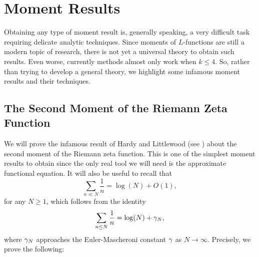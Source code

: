 \chapter{Moment Results}
  Obtaining any type of moment result is, generally speaking, a very difficult task requiring delicate analytic techniques. Since moments of $L$-functions are still a modern topic of research, there is not yet a universal theory to obtain such results. Even worse, currently methods almost only work when $k \le 4$. So, rather than trying to develop a general theory, we highlight some infamous moment results and their techniques.
  \section{The Second Moment of the Riemann Zeta Function}
    We will prove the infamous result of Hardy and Littlewood (see \cite{hardy1916contributions}) about the second moment of the Riemann zeta function. This is one of the simplest moment results to obtain since the only real tool we will need is the approximate functional equation. It will also be useful to recall that
    \begin{equation}\label{equ:approximation_for_harmonic_sums}
      \sum_{n \ll N}\frac{1}{n} = \log(N)+O(1),
    \end{equation}
    for any $N \ge 1$, which follows from the identity
    \[
      \sum_{n \le N}\frac{1}{n} = \log(N)+\gamma_{N},
    \]
    where $\gamma_{N}$ approaches the Euler-Mascheroni constant $\gamma$ as $N \to \infty$. Precisely, we prove the following:

